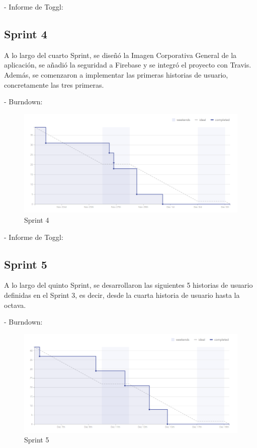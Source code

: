 \documentclass[11pt,openany]{book}
\begin{document}
- Informe de Toggl:



\subsection{Sprint 4}

A lo largo del cuarto Sprint, se diseñó la Imagen Corporativa General de la aplicación, se añadió la seguridad a Firebase y se integró el proyecto con Travis. Además, se comenzaron a implementar las primeras historias de usuario, concretamente las tres primeras.

- Burndown:

\begin{figure}[H]
\centering
\includegraphics[totalheight=7cm]{burndowns/Sprint4.png}
\caption{Sprint 4}
\end{figure}

- Informe de Toggl:



\subsection{Sprint 5}

A lo largo del quinto Sprint, se desarrollaron las siguientes 5 historias de usuario definidas en el Sprint 3, es decir, desde la cuarta historia de usuario hasta la octava.

- Burndown:

\begin{figure}[H]
\centering
\includegraphics[totalheight=7cm]{burndowns/Sprint5.png}
\caption{Sprint 5}
\end{figure}
\end{document}
